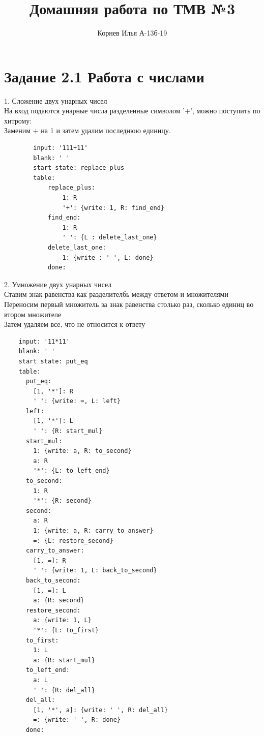 \documentclass[12pt]{article}
\begin{document}
	\title{Домашняя работа по ТМВ №3}
	\author{Корнев Илья А-13б-19}
	\date{}
	\maketitle
	\setlength{\footskip}{60pt}
	\section*{Задание 2.1 Работа с числами}
	1. Сложение двух унарных чисел\\
	\indent На вход подаются унарные числа разделенные символом '+', можно поступить по хитрому:\\
	\indent Заменим + на 1 и затем удалим последнюю единицу.
	\begin{lstlisting}
		input: '111+11'
 		blank: ' '
  		start state: replace_plus
  		table:
    		replace_plus:
      			1: R
      			'+': {write: 1, R: find_end}
    		find_end:
      			1: R
      			' ': {L : delete_last_one}
    		delete_last_one:
      			1: {write : ' ', L: done}
    		done:
	\end{lstlisting}
	2. Умножение двух унарных чисел\\
	\indent Ставим знак равенства как разделителбь между ответом и множителями\\
	\indent Переносим первый множитель за знак равенства столько раз, сколько единиц во втором множителе\\
	\indent Затем удаляем все, что не относится к ответу
	\begin{lstlisting}
	input: '11*11'
	blank: ' '
	start state: put_eq
	table:
	  put_eq: 
	    [1, '*']: R
	    ' ': {write: =, L: left}
	  left:
	    [1, '*']: L
	    ' ': {R: start_mul}
	  start_mul:
	    1: {write: a, R: to_second}
	    a: R
	    '*': {L: to_left_end}
	  to_second:
	    1: R
	    '*': {R: second}
	  second:
	    a: R
	    1: {write: a, R: carry_to_answer}
	    =: {L: restore_second}
	  carry_to_answer:
	    [1, =]: R
	    ' ': {write: 1, L: back_to_second}
	  back_to_second:
	    [1, =]: L
	    a: {R: second}
	  restore_second:
	    a: {write: 1, L}
	    '*': {L: to_first}
	  to_first:
	    1: L
	    a: {R: start_mul}
	  to_left_end:
	    a: L
	    ' ': {R: del_all}
	  del_all:
	    [1, '*', a]: {write: ' ', R: del_all}
	    =: {write: ' ', R: done}
	  done:
	\end{lstlisting}
	
\end{document}
